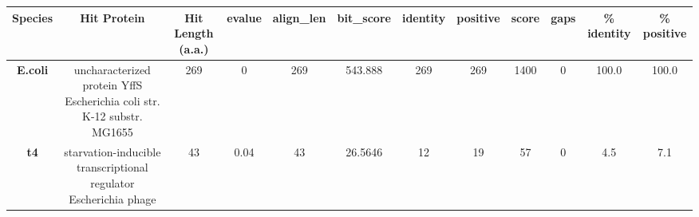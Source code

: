 \begin{tabular}{|c|c|c|c|c|c|c|c|c|c|c|c|} \hline
\textbf{Species} & \textbf{Hit Protein} & \textbf{Hit Length (a.a.)} & \textbf{evalue} & \textbf{align\_len} & \textbf{bit\_score} & \textbf{identity} & \textbf{positive} & \textbf{score} & \textbf{gaps} & \textbf{\% identity} & \textbf{\% positive} \\ \hline
\textbf{E.coli} & uncharacterized protein YffS Escherichia coli str. K-12 substr. MG1655 & 269 & 0 & 269 & 543.888 & 269 & 269 & 1400 & 0 & 100.0 & 100.0\\
\textbf{t4} & starvation-inducible transcriptional regulator Escherichia phage  & 43 & 0.04 & 43 & 26.5646 & 12 & 19 & 57 & 0 & 4.5 & 7.1\\
\hline \end{tabular}
